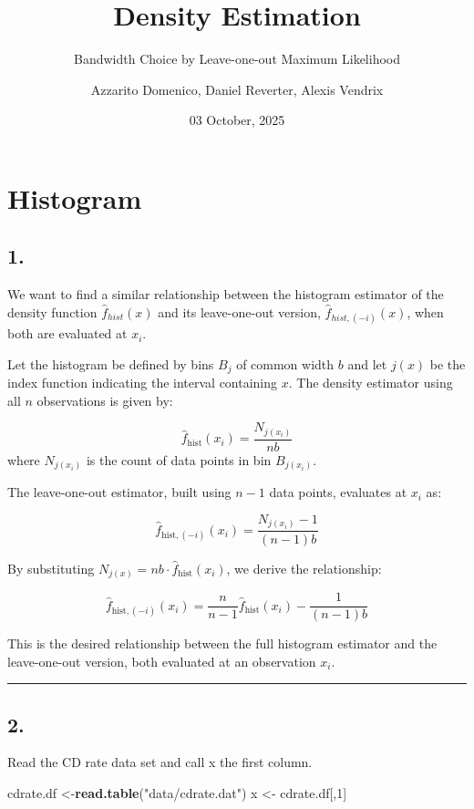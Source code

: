 \documentclass[
]{article}
\title{Density Estimation}
\subtitle{Bandwidth Choice by Leave-one-out Maximum Likelihood}
\author{Azzarito Domenico, Daniel Reverter, Alexis Vendrix}
\date{03 October, 2025}
\newenvironment{Shaded}{\begin{snugshade}}{\end{snugshade}}
\newcommand{\DecValTok}[1]{\textcolor[rgb]{0.00,0.00,0.81}{#1}}
\newcommand{\FunctionTok}[1]{\textcolor[rgb]{0.13,0.29,0.53}{\textbf{#1}}}
\newcommand{\NormalTok}[1]{#1}
\newcommand{\OtherTok}[1]{\textcolor[rgb]{0.56,0.35,0.01}{#1}}
\newcommand{\StringTok}[1]{\textcolor[rgb]{0.31,0.60,0.02}{#1}}
\begin{document}
\maketitle

\section{Histogram}\label{histogram}

\subsection{1.}\label{section}

We want to find a similar relationship between the histogram estimator
of the density function \(\hat{f}_{hist}(x)\) and its leave-one-out
version, \(\hat{f}_{hist,(-i)}(x)\), when both are evaluated at \(x_i\).

Let the histogram be defined by bins \(B_j\) of common width \(b\) and
let \(j(x)\) be the index function indicating the interval containing
\(x\). The density estimator using all \(n\) observations is given by:

\[\hat{f}_{\mathrm{hist}}(x_i) = \frac{N_{j(x_i)}}{nb} \] where
\(N_{j(x_i)}\) is the count of data points in bin \(B_{j(x_i)}\).

The leave-one-out estimator, built using \(n-1\) data points, evaluates
at \(x_i\) as:

\[
\hat{f}_{\mathrm{hist},(-i)}(x_i) = \frac{N_{j(x_i)} - 1}{(n-1)b} 
\]

By substituting \(N_{j(x)} = nb \cdot \hat{f}_{\mathrm{hist}}(x_i)\), we
derive the relationship:

\[
\hat{f}_{\mathrm{hist},(-i)}(x_i) = \frac{n}{n-1}\hat{f}_{\mathrm{hist}}(x_i) - \frac{1}{(n-1)b}
\]

This is the desired relationship between the full histogram estimator
and the leave-one-out version, both evaluated at an observation \(x_i\).

\begin{center}\rule{0.5\linewidth}{0.5pt}\end{center}

\subsection{2.}\label{section-1}

Read the CD rate data set and call x the first column.

\begin{Shaded}
\begin{Highlighting}[]
\NormalTok{cdrate.df }\OtherTok{\textless{}{-}}\FunctionTok{read.table}\NormalTok{(}\StringTok{"data/cdrate.dat"}\NormalTok{)}
\NormalTok{x }\OtherTok{\textless{}{-}}\NormalTok{ cdrate.df[,}\DecValTok{1}\NormalTok{]}
\end{Highlighting}
\end{Shaded}
\end{document}
